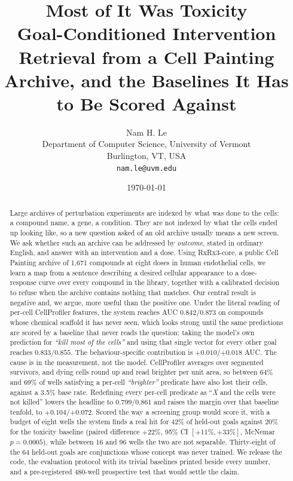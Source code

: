 \documentclass[11pt]{article}
\title{\textbf{Most of It Was Toxicity}\\[0.3em]
\large Goal-Conditioned Intervention Retrieval from a Cell Painting Archive,
and the Baselines It Has to Be Scored Against}
\author{Nam H. Le\\
Department of Computer Science, University of Vermont\\
Burlington, VT, USA\\
\texttt{nam.le@uvm.edu}}
\date{\today}
\newcommand{\goal}[1]{\textit{``#1''}}
\begin{document}
\maketitle

\begin{abstract}
\noindent
Large archives of perturbation experiments are indexed by what was done to the cells:
a compound name, a gene, a condition. They are not indexed by what the cells ended up
looking like, so a new question asked of an old archive usually means a new screen.
We ask whether such an archive can be addressed by \emph{outcome}, stated in ordinary
English, and answer with an intervention and a dose. Using RxRx3-core, a public Cell
Painting archive of 1{,}671 compounds at eight doses in human endothelial cells, we
learn a map from a sentence describing a desired cellular appearance to a
dose-response curve over every compound in the library, together with a calibrated
decision to refuse when the archive contains nothing that matches.
Our central result is negative and, we argue, more useful than the positive one. Under
the literal reading of per-cell CellProfiler features, the system reaches AUC
$0.842/0.873$ on compounds whose chemical scaffold it has never seen, which looks
strong until the same predictions are scored by a baseline that never reads the
question: taking the model's own prediction for \goal{kill most of the cells} and
using that single vector for every other goal reaches $0.833/0.855$. The
behaviour-specific contribution is $+0.010$/$+0.018$ AUC. The cause is in the
measurement, not the model. CellProfiler averages over segmented survivors, and dying
cells round up and read brighter per unit area, so between 64\% and 69\% of wells
satisfying a per-cell \goal{brighter} predicate have also lost their cells, against a
3.5\% base rate. Redefining every per-cell predicate as ``\emph{X} and the cells were
not killed'' lowers the headline to $0.799/0.861$ and raises the margin over that
baseline tenfold, to $+0.104$/$+0.072$. Scored the way a screening group would score it,
with a budget of eight wells the system finds a real hit for 42\% of held-out goals
against 20\% for the toxicity baseline (paired difference $+22\%$, 95\% CI
$[+11\%,+33\%]$, McNemar $p=0.0005$), while between 16 and 96 wells the two are not
separable. Thirty-eight of the 64 held-out goals are conjunctions whose concept was
never trained. We release the code, the evaluation protocol with its trivial baselines
printed beside every number, and a pre-registered 480-well prospective test that would
settle the claim.
\end{abstract}
\end{document}
